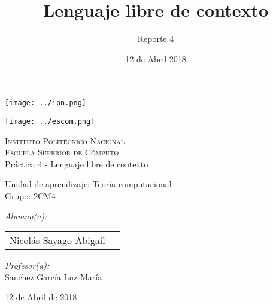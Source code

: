 \documentclass[12pt]{article}
\date{ 12 de Abril 2018}
\title{Lenguaje libre de contexto}
\author{Reporte 4}
\begin{document}
		\begin{titlepage}
			\begin{center}
				
				
				\noindent
				\begin{minipage}{0.5\textwidth}
					\begin{flushleft} \large
						\texttt{[image: ../ipn.png]}
					\end{flushleft}
				\end{minipage}%
				\begin{minipage}{0.55\textwidth}
					\begin{flushright} \large
						\texttt{[image: ../escom.png]}
					\end{flushright}
				\end{minipage}
				
				\textsc{\LARGE Instituto Politécnico Nacional}\\[0.5cm]
				
				\textsc{\Large Escuela Superior de Cómputo}\\[1cm]
				
				
				{ \huge Práctica 4 - Lenguaje libre de contexto \\[1cm] }
				
				{ \Large Unidad de aprendizaje: Teoría computacional} \\[1cm]
				
				{ \Large Grupo: 2CM4 } \\[1cm]
				
				\noindent
				\begin{minipage}{0.5\textwidth}
					\begin{flushleft} \large
						\emph{Alumno(a):}\\
						
						\begin{tabular}{ll}
					     Nicolás Sayago Abigail\\
					\end{tabular}
					\end{flushleft}
				\end{minipage}%
				\begin{minipage}{0.5\textwidth}
					\begin{flushright} \large
						\emph{Profesor(a):} \\
						Sanchez García Luz María  \\
					\end{flushright}
				\end{minipage}
				
				\vfill
				
				{\large 12 de Abril de 2018}
			\end{center}
		\end{titlepage}
	
\end{document}
